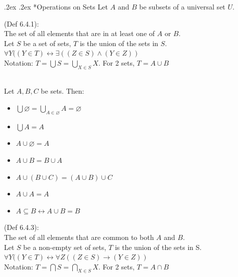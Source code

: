 \documentclass[10pt,landscape,a4paper]{article}
\makeatletter
\newenvironment{descitemize} %
{\begin{description}[leftmargin=*,before=\let\makelabel\descitemlabel]}
{\end{description}}
\newcommand{\descitemlabel}[1]{%
\textbullet\ \textbf{#1}%
}
\renewcommand{\subsection}{\@startsection{subsection}{1}{0mm}%
                                {.2ex}%
                                {.2ex}%
                                {\sffamily\bfseries}}
\makeatother
\begin{document}
\begin{multicols*}{4}
  \subsection*{Operations on Sets}
  Let $A$ and $B$ be subsets of a universal set $U$.
  \begin{descitemize}
    \item [Union] (Def 6.4.1):\\
    The set of all elements that are in at least one of $A$ or $B$.\\
    Let $S$ be a set of sets, $T$ is the union of the sets in $S$.\\
    $\forall Y ((Y \in T)\leftrightarrow \exists ((Z\in S) \land (Y\in Z))$\\
    Notation: $T=\bigcup S = \bigcup\limits_{X\in S}^{}X$. For 2 sets, $T=A\cup B$

    \item [Prop 6.4.2] \leavevmode \\
    Let $A,B,C$ be sets. Then:
    \begin{itemize}
      \item $\bigcup \varnothing = \bigcup_{A\in \varnothing}^{}A=\varnothing$
      \item $\bigcup{A}=A$
      \item $A\cup \varnothing = A$
      \item $A\cup B = B\cup A$
      \item $A\cup (B\cup C) = (A\cup B)\cup C$
      \item $A\cup A = A$
      \item $A \subseteq B \leftrightarrow A\cup B = B$
    \end{itemize}

    \item [Intersection] (Def 6.4.3):\\
    The set of all elements that are common to both $A$ and $B$.\\
    Let $S$ be a non-empty set of sets, $T$ is the union of the sets in S.\\
    $\forall Y((Y \in T) \leftrightarrow \forall Z ((Z\in S) \rightarrow (Y \in Z))$\\
    Notation: $T=\bigcap S = \bigcap\limits_{X\in S}^{}X$. For 2 sets, $T=A\cap B$


\end{descitemize}
\end{multicols*}
\end{document}
